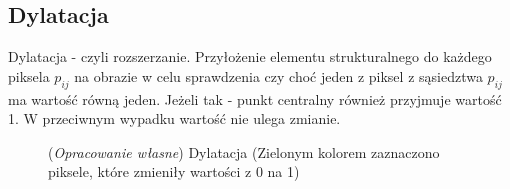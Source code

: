 \documentclass{article}
\begin{document}
        \subsection{Dylatacja}
        {
            \Large
            \justifying
            \quad
            Dylatacja - czyli rozszerzanie.
            Przyłożenie elementu strukturalnego do każdego piksela \(p_{ij}\) na obrazie w celu sprawdzenia czy choć jeden z piksel z sąsiedztwa \(p_{ij}\) ma wartość równą jeden.
            Jeżeli tak - punkt centralny również przyjmuje wartość 1. W przeciwnym wypadku wartość nie ulega zmianie.
        }
        \begin{figure}[H]
            \centering
            \qquad
            \qquad
            \caption{(\textit{Opracowanie własne}) Dylatacja (Zielonym kolorem zaznaczono piksele, które zmieniły wartości z 0 na 1)}
        \end{figure}
\end{document}

